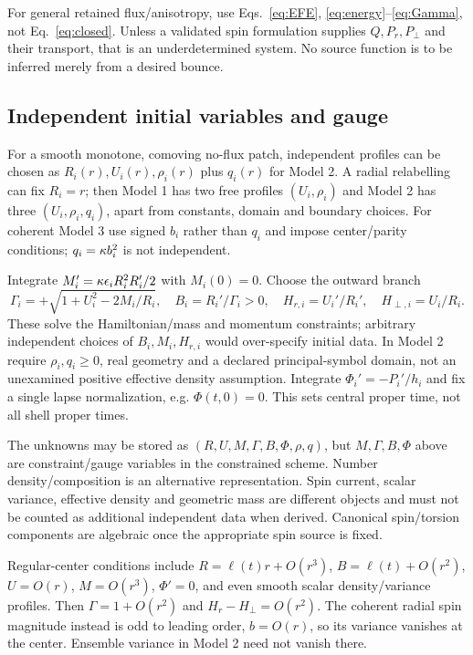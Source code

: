 For general retained flux/anisotropy, use Eqs.~\eqref{eq:EFE}, \eqref{eq:energy}--\eqref{eq:Gamma}, not Eq.~\eqref{eq:closed}. Unless a validated spin formulation supplies $Q,P_r,P_\perp$ and their transport, that is an underdetermined system. No source function is to be inferred merely from a desired bounce.

\subsection{Independent initial variables and gauge}
For a smooth monotone, comoving no-flux patch, independent profiles can be chosen as $R_i(r),U_i(r),\rho_i(r)$ plus $q_i(r)$ for Model 2. A radial relabelling can fix $R_i=r$; then Model 1 has two free profiles $(U_i,\rho_i)$ and Model 2 has three $(U_i,\rho_i,q_i)$, apart from constants, domain and boundary choices. For coherent Model 3 use signed $b_i$ rather than $q_i$ and impose center/parity conditions; $q_i=\kappa b_i^2$ is not independent.

Integrate $M_i'=\kappa\epsilon_iR_i^2R_i'/2$ with $M_i(0)=0$. Choose the outward branch
\begin{equation}
 \Gamma_i=+\sqrt{1+U_i^2-2M_i/R_i},\quad B_i=R_i'/\Gamma_i>0,
 \quad H_{r,i}=U_i'/R_i',\quad H_{\perp,i}=U_i/R_i.
\end{equation}
These solve the Hamiltonian/mass and momentum constraints; arbitrary independent choices of $B_i,M_i,H_{r,i}$ would over-specify initial data. In Model 2 require $\rho_i,q_i\geq0$, real geometry and a declared principal-symbol domain, not an unexamined positive effective density assumption. Integrate $\Phi_i'=-P_i'/h_i$ and fix a single lapse normalization, e.g. $\Phi(t,0)=0$. This sets central proper time, not all shell proper times.

The unknowns may be stored as $(R,U,M,\Gamma,B,\Phi,\rho,q)$, but $M,\Gamma,B,\Phi$ above are constraint/gauge variables in the constrained scheme. Number density/composition is an alternative representation. Spin current, scalar variance, effective density and geometric mass are different objects and must not be counted as additional independent data when derived. Canonical spin/torsion components are algebraic once the appropriate spin source is fixed.

Regular-center conditions include $R=\ell(t)r+O(r^3)$, $B=\ell(t)+O(r^2)$, $U=O(r)$, $M=O(r^3)$, $\Phi'=0$, and even smooth scalar density/variance profiles. Then $\Gamma=1+O(r^2)$ and $H_r-H_\perp=O(r^2)$. The coherent radial spin magnitude instead is odd to leading order, $b=O(r)$, so its variance vanishes at the center. Ensemble variance in Model 2 need not vanish there.

